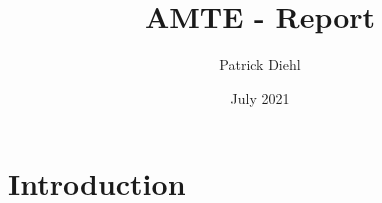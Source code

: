 \documentclass{article}
\title{AMTE - Report}
\author{Patrick Diehl}
\date{July 2021}
\begin{document}
\maketitle

\section{Introduction}
\end{document}
